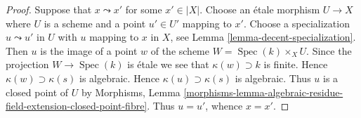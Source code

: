 \documentclass{stacks-project}
\theoremstyle{plain}
\theoremstyle{definition}
\theoremstyle{remark}
\numberwithin{equation}{subsection}
\def\Spec{\mathop{\mathrm{Spec}}}
\begin{document}
\begin{proof}
Suppose that $x \leadsto x'$ for some $x' \in |X|$. Choose an
\'etale morphism $U \to X$ where $U$ is a scheme and a point $u' \in U'$
mapping to $x'$. Choose a specialization $u \leadsto u'$ in $U$ with $u$
mapping to $x$ in $X$, see Lemma \ref{lemma-decent-specialization}.
Then $u$ is the image of a point $w$ of the scheme
$W = \Spec(k) \times_X U$. Since the projection $W \to \Spec(k)$ is \'etale
we see that $\kappa(w) \supset k$ is finite. Hence
$\kappa(w) \supset \kappa(s)$ is algebraic. Hence $\kappa(u) \supset \kappa(s)$
is algebraic. Thus $u$ is a closed point of $U$ by
Morphisms, Lemma
\ref{morphisms-lemma-algebraic-residue-field-extension-closed-point-fibre}.
Thus $u = u'$, whence $x = x'$.
\end{proof}
\end{document}
